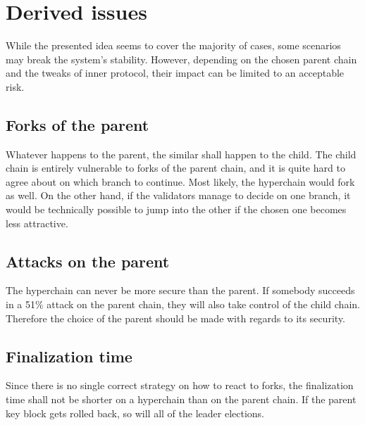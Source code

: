 \section{Derived issues}

While the presented idea seems to cover the majority of cases, some scenarios
may break the system's stability. However, depending on the chosen parent chain
and the tweaks of inner protocol, their impact can be limited to an acceptable
risk.

\subsection{Forks of the parent}

Whatever happens to the parent, the similar shall happen to the child. The child
chain is entirely vulnerable to forks of the parent chain, and it is quite hard
to agree about on which branch to continue. Most likely, the hyperchain would
fork as well. On the other hand, if the validators manage to decide on one
branch, it would be technically possible to jump into the other if the chosen
one becomes less attractive.

\subsection{Attacks on the parent}

The hyperchain can never be more secure than the parent. If somebody succeeds in
a 51\% attack on the parent chain, they will also take control of the child
chain. Therefore the choice of the parent should be made with regards to its
security.

\subsection{Finalization time}

Since there is no single correct strategy on how to react to forks, the
finalization time shall not be shorter on a hyperchain than on the parent chain.
If the parent key block gets rolled back, so will all of the leader elections.
